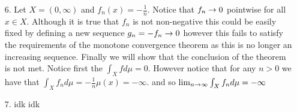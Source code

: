 \documentclass[12pt]{amsart}
\begin{document}
\begin{itemize}
\begin{itemize}
    \end{itemize}

    \item[6.] Let $X=(0,\infty)$ and $f_n(x)=-\frac{1}{n}$. Notice that $f_n\rightarrow 0$ pointwise for all $x\in X$. 
    Although it is true that $f_n$ is not non-negative this could be easily fixed by defining a new 
    sequence $g_n=-f_n\rightarrow 0$ however this fails to satisfy the requirements of the monotone convergence theorem
    as this is no longer an increasing sequence. Finally we will show that the conclusion of the theorem is not met.
    Notice first the $\int_X f d\mu = 0$. However notice that for any $n>0$ we have that 
    $\int_X f_n d\mu = -\frac{1}{n}\mu(x)=-\infty$. and so $\lim_{n\rightarrow \infty}\int_X f_n d\mu =-\infty$


    \item[7.] idk
              idk
\end{itemize}

\end{document}
